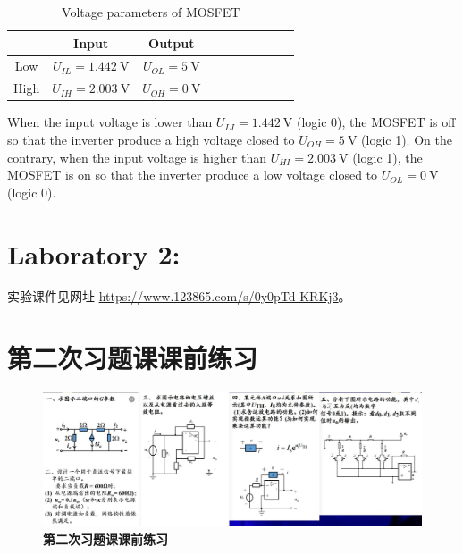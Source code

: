 \documentclass[UTF8]{report}
\theoremstyle{MyLineTheoremStyle} %
\theoremstyle{MyBlockTheoremStyle} %
\theoremstyle{MySubsubsectionStyle} %
\begin{document}
\begin{table}[H]\centering
    \caption{Voltage parameters of MOSFET}
    \label{Voltage parameters of MOSFET}
\begin{tabular}{cccccccccc}\toprule
        & Input  & Output &  \\
    \midrule
    Low & $U_{IL} = 1.442 \ \mathrm{V}$  & $U_{OL} = 5 \ \mathrm{V}$  \\
    High & $U_{IH} = 2.003 \ \mathrm{V}$ & $U_{OH} = 0 \ \mathrm{V}$  \\
    \bottomrule
\end{tabular}
\end{table}
When the input voltage is lower than $U_{LI} = 1.442 \ \mathrm{V}$ (logic 0), the MOSFET is off so that the inverter produce a high voltage closed to $U_{OH}=5 \ \mathrm{V}$ (logic 1). On the contrary, when the input voltage is higher than $U_{HI} = 2.003 \ \mathrm{V}$ (logic 1), the MOSFET is on so that the inverter produce a low voltage closed to $U_{OL} = 0 \ \mathrm{V}$ (logic 0).





\chapter{Laboratory 2: }
\thispagestyle{fancy}

实验课件见网址 \href{}{https://www.123865.com/s/0y0pTd-KRKj3}。


\chapter{第二次习题课课前练习}
\thispagestyle{fancy}

\begin{figure}[H]\centering
\includegraphics[width=0.95\columnwidth]{assets/4/16b6858d371dc967c7673595957d383b_720.jpg}
\caption{\bfseries 第二次习题课课前练习}\label{第二次习题课课前练习}
\end{figure}
\end{document}
